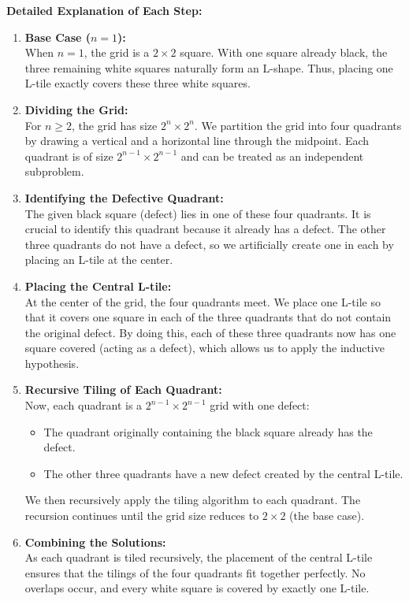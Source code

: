 \documentclass[11pt]{article}
\begin{document}
    \bigskip
    
    \textbf{Detailed Explanation of Each Step:}
    
    \begin{enumerate}
        \item \textbf{Base Case (\( n = 1 \)):} \\
        When \( n = 1 \), the grid is a \( 2 \times 2 \) square. With one square already black, the three remaining white squares naturally form an L-shape. Thus, placing one L-tile exactly covers these three white squares.
        
        \item \textbf{Dividing the Grid:} \\
        For \( n \ge 2 \), the grid has size \( 2^n \times 2^n \). We partition the grid into four quadrants by drawing a vertical and a horizontal line through the midpoint. Each quadrant is of size \( 2^{n-1} \times 2^{n-1} \) and can be treated as an independent subproblem.
        
        \item \textbf{Identifying the Defective Quadrant:} \\
        The given black square (defect) lies in one of these four quadrants. It is crucial to identify this quadrant because it already has a defect. The other three quadrants do not have a defect, so we artificially create one in each by placing an L-tile at the center.
        
        \item \textbf{Placing the Central L-tile:} \\
        At the center of the grid, the four quadrants meet. We place one L-tile so that it covers one square in each of the three quadrants that do not contain the original defect. By doing this, each of these three quadrants now has one square covered (acting as a defect), which allows us to apply the inductive hypothesis.
        
        \item \textbf{Recursive Tiling of Each Quadrant:} \\
        Now, each quadrant is a \( 2^{n-1} \times 2^{n-1} \) grid with one defect:
        \begin{itemize}
            \item The quadrant originally containing the black square already has the defect.
            \item The other three quadrants have a new defect created by the central L-tile.
        \end{itemize}
        We then recursively apply the tiling algorithm to each quadrant. The recursion continues until the grid size reduces to \( 2 \times 2 \) (the base case).
        
        \item \textbf{Combining the Solutions:} \\
        As each quadrant is tiled recursively, the placement of the central L-tile ensures that the tilings of the four quadrants fit together perfectly. No overlaps occur, and every white square is covered by exactly one L-tile.
    \end{enumerate}
    
\end{document}
